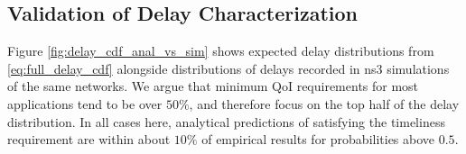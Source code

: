 \subsection{Validation of Delay Characterization}

Figure \ref{fig:delay_cdf_anal_vs_sim} shows expected delay distributions from \ref{eq:full_delay_cdf} alongside distributions of delays recorded in ns3 simulations of the same networks.  We argue that minimum QoI requirements for most applications tend to be over $50\%$, and therefore focus on the top half of the delay distribution.  In all cases here, analytical predictions of satisfying the timeliness requirement are within about $10\%$ of empirical results for probabilities above $0.5$.  


%

%
%

%
